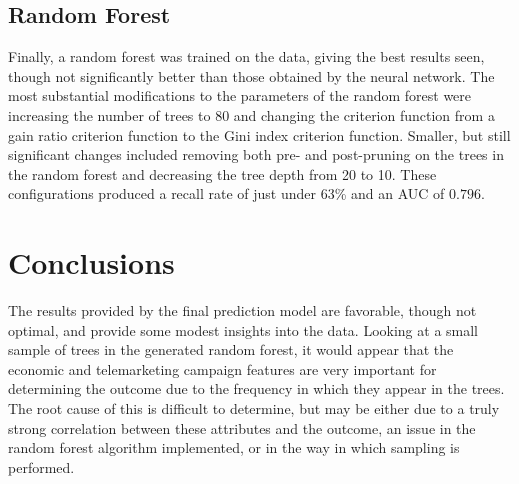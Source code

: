 \documentclass[prodmode]{acmsmall} %
\begin{document}
\begin{table}[!t]
\end{table}

\subsection{Random Forest}
Finally, a random forest was trained on the data, giving the best results seen,
though not significantly better than those obtained by the neural network. The
most substantial modifications to the parameters of the random forest were
increasing the number of trees to 80 and changing the criterion function from a
gain ratio criterion function to the Gini index criterion function. Smaller, but
still significant changes included removing both pre- and post-pruning on the
trees in the random forest and decreasing the tree depth from 20 to 10. These
configurations produced a recall rate of just under 63\% and an AUC of $0.796$.

\begin{table}[!t]
\end{table}

\section{Conclusions}
The results provided by the final prediction model are favorable, though not
optimal, and provide some modest insights into the data. Looking at a small
sample of trees in the generated random forest, it would appear that the
economic and telemarketing campaign features are very important for determining
the outcome due to the frequency in which they appear in the trees. The root
cause of this is difficult to determine, but may be either due to a truly strong
correlation between these attributes and the outcome, an issue in the random
forest algorithm implemented, or in the way in which sampling is performed.
\end{document}
